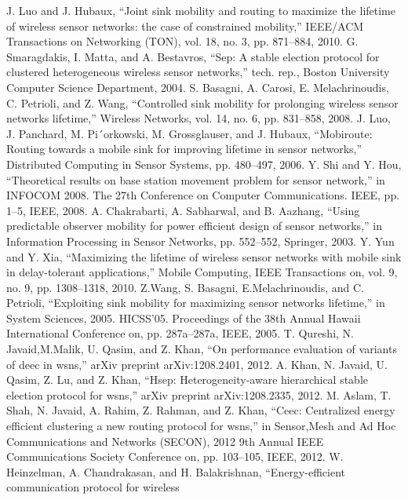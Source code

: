 \documentclass{article}
\begin{document}
\begin{thebibliography}{00}

 J. Luo and J. Hubaux, “Joint sink mobility and routing to
maximize the lifetime of wireless sensor networks: the
case of constrained mobility,” IEEE/ACM Transactions
on Networking (TON), vol. 18, no. 3, pp. 871–884, 2010.
 G. Smaragdakis, I. Matta, and A. Bestavros, “Sep:
A stable election protocol for clustered heterogeneous
wireless sensor networks,” tech. rep., Boston University
Computer Science Department, 2004.
 S. Basagni, A. Carosi, E. Melachrinoudis, C. Petrioli,
and Z. Wang, “Controlled sink mobility for prolonging
wireless sensor networks lifetime,” Wireless Networks,
vol. 14, no. 6, pp. 831–858, 2008.
 J. Luo, J. Panchard, M. Pi´orkowski, M. Grossglauser,
and J. Hubaux, “Mobiroute: Routing towards a mobile
sink for improving lifetime in sensor networks,” Distributed
Computing in Sensor Systems, pp. 480–497,
2006.
 Y. Shi and Y. Hou, “Theoretical results on base station
movement problem for sensor network,” in INFOCOM
2008. The 27th Conference on Computer Communications.
IEEE, pp. 1–5, IEEE, 2008.
 A. Chakrabarti, A. Sabharwal, and B. Aazhang, “Using
predictable observer mobility for power efficient design
of sensor networks,” in Information Processing in Sensor
Networks, pp. 552–552, Springer, 2003.
 Y. Yun and Y. Xia, “Maximizing the lifetime of wireless
sensor networks with mobile sink in delay-tolerant applications,”
Mobile Computing, IEEE Transactions on,
vol. 9, no. 9, pp. 1308–1318, 2010.
 Z.Wang, S. Basagni, E.Melachrinoudis, and C. Petrioli,
“Exploiting sink mobility for maximizing sensor networks
lifetime,” in System Sciences, 2005. HICSS’05.
Proceedings of the 38th Annual Hawaii International
Conference on, pp. 287a–287a, IEEE, 2005.
 T. Qureshi, N. Javaid,M.Malik, U. Qasim, and Z. Khan,
“On performance evaluation of variants of deec in
wsns,” arXiv preprint arXiv:1208.2401, 2012.
 A. Khan, N. Javaid, U. Qasim, Z. Lu, and Z. Khan,
“Hsep: Heterogeneity-aware hierarchical stable election
protocol for wsns,” arXiv preprint arXiv:1208.2335,
2012.
 M. Aslam, T. Shah, N. Javaid, A. Rahim, Z. Rahman,
and Z. Khan, “Ceec: Centralized energy efficient clustering
a new routing protocol for wsns,” in Sensor,Mesh
and Ad Hoc Communications and Networks (SECON),
2012 9th Annual IEEE Communications Society Conference
on, pp. 103–105, IEEE, 2012.
 W. Heinzelman, A. Chandrakasan, and H. Balakrishnan,
“Energy-efficient communication protocol for wireless

\end{thebibliography}
\end{document}
